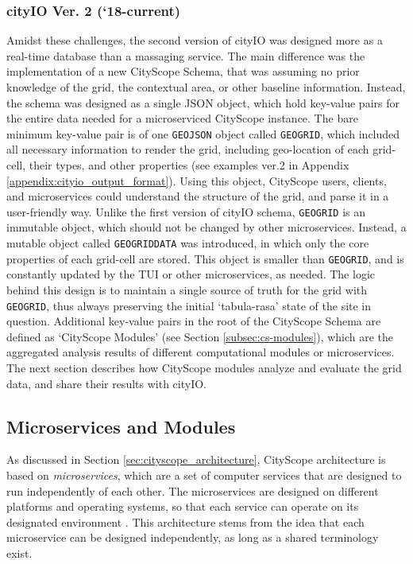 {{      \subsubsection{cityIO Ver. 2 (`18-current)}
      {
          Amidst these challenges, the second version of cityIO was designed more as a real-time database than a massaging service. The main difference was the implementation of a new CityScope Schema, that was assuming no prior knowledge of the grid, the contextual area, or other baseline information. Instead, the schema was designed as a single JSON object, which hold key-value pairs for the entire data needed for a microserviced CityScope instance. The bare minimum key-value pair is of one \verb|GEOJSON| object called \verb|GEOGRID|, which included all necessary information to render the grid, including geo-location of each grid-cell, their types, and other properties (see examples ver.2 in Appendix \eqref{appendix:cityio_output_format}). Using this object, CityScope users, clients, and microservices could understand the structure of the grid, and parse it in a user-friendly way.
          \newline
          Unlike the first version of cityIO schema, \verb|GEOGRID| is an immutable object, which should not be changed by other microservices. Instead, a mutable object called \verb|GEOGRIDDATA| was introduced, in which only the core properties of each grid-cell are stored. This object is smaller than \verb|GEOGRID|, and is constantly updated by the TUI or other microservices, as needed. The logic behind this design is to maintain a single source of truth for the grid with \verb|GEOGRID|, thus always preserving the initial `tabula-rasa' state of the site in question.
          \newline
          Additional key-value pairs in the root of the CityScope Schema are defined as `CityScope Modules' (see Section \eqref{subsec:cs-modules}), which are the aggregated analysis results of different computational modules or microservices. The next section describes how CityScope modules analyze and evaluate the grid data, and share their results with cityIO.
      }
  }

  \subsection{Microservices and Modules}\label{subsec:cs-modules}
  {
      As discussed in Section \eqref{sec:cityscope_architecture}, CityScope architecture is based on \textit{microservices}, which are a set of computer services that are designed to run independently of each other. The microservices are designed on different platforms and operating systems, so that each service can operate on its designated environment \cite{balalaie2016microservices}. This architecture stems from the idea that each microservice can be designed independently, as long as a shared terminology exist.

}}
